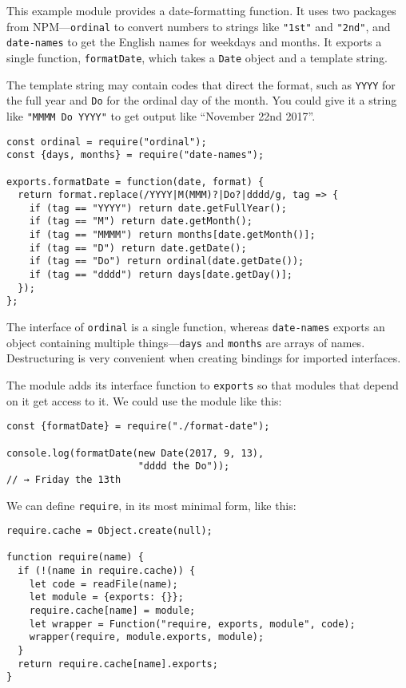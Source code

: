 This example module provides a date-formatting function. It uses two packages from NPM—\lstinline`ordinal` to convert numbers to strings like \lstinline`"1st"` and \lstinline`"2nd"`, and \lstinline`date-names` to get the English names for weekdays and months. It exports a single function, \lstinline`formatDate`, which takes a \lstinline`Date` object and a template string.

The template string may contain codes that direct the format, such as \lstinline`YYYY` for the full year and \lstinline`Do` for the ordinal day of the month. You could give it a string like \lstinline`"MMMM Do YYYY"` to get output like ``November 22nd 2017''.

\begin{lstlisting}
const ordinal = require("ordinal");
const {days, months} = require("date-names");

exports.formatDate = function(date, format) {
  return format.replace(/YYYY|M(MMM)?|Do?|dddd/g, tag => {
    if (tag == "YYYY") return date.getFullYear();
    if (tag == "M") return date.getMonth();
    if (tag == "MMMM") return months[date.getMonth()];
    if (tag == "D") return date.getDate();
    if (tag == "Do") return ordinal(date.getDate());
    if (tag == "dddd") return days[date.getDay()];
  });
};
\end{lstlisting}
\noindent{}

The interface of \lstinline`ordinal` is a single function, whereas \lstinline`date-names` exports an object containing multiple things—\lstinline`days` and \lstinline`months` are arrays of names. Destructuring is very convenient when creating bindings for imported interfaces.

The module adds its interface function to \lstinline`exports` so that modules that depend on it get access to it. We could use the module like this:

\begin{lstlisting}
const {formatDate} = require("./format-date");

console.log(formatDate(new Date(2017, 9, 13),
                       "dddd the Do"));
// → Friday the 13th
\end{lstlisting}
\noindent{}

\label{modules.require}We can define \lstinline`require`, in its most minimal form, like this:

\begin{lstlisting}
require.cache = Object.create(null);

function require(name) {
  if (!(name in require.cache)) {
    let code = readFile(name);
    let module = {exports: {}};
    require.cache[name] = module;
    let wrapper = Function("require, exports, module", code);
    wrapper(require, module.exports, module);
  }
  return require.cache[name].exports;
}
\end{lstlisting}
\noindent{}

